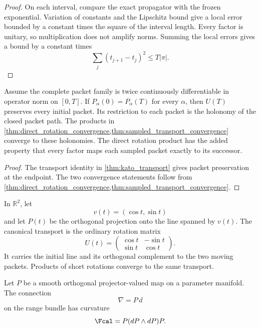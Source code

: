 \begin{proof}
On each interval, compare the exact propagator with the frozen exponential.  Variation of constants and the Lipschitz bound give a local error bounded by a constant times the square of the interval length.  Every factor is unitary, so multiplication does not amplify norms.  Summing the local errors gives a bound by a constant times
\[
\sum_j(t_{j+1}-t_j)^2
\le
T|\pi|.
\]
\end{proof}

\begin{corollary}\label{cor:continuous_holonomy}
Assume the complete packet family is twice continuously differentiable in operator norm on $[0,T]$. If $P_\alpha(0)=P_\alpha(T)$ for every $\alpha$, then $U(T)$ preserves every initial packet.  Its restriction to each packet is the holonomy of the closed packet path.  The products in \cref{thm:direct_rotation_convergence,thm:sampled_transport_convergence} converge to these holonomies.  The direct rotation product has the added property that every factor maps each sampled packet exactly to its successor.
\end{corollary}

\begin{proof}
The transport identity in \cref{thm:kato_transport} gives packet preservation at the endpoint.  The two convergence statements follow from \cref{thm:direct_rotation_convergence,thm:sampled_transport_convergence}.
\end{proof}

\begin{example}\label{ex:rotating_line}
In $\mathbb R^2$, let
\[
v(t)=(\cos t,\sin t)
\]
and let $P(t)$ be the orthogonal projection onto the line spanned by $v(t)$.  The canonical transport is the ordinary rotation matrix
\[
U(t)=
\begin{pmatrix}
\cos t&-\sin t\\
\sin t&\cos t
\end{pmatrix}.
\]
It carries the initial line and its orthogonal complement to the two moving packets.  Products of short rotations converge to the same transport.
\end{example}


\begin{standardfact}\label{fact:projected_curvature}
Let $P$ be a smooth orthogonal projector-valued map on a parameter manifold.  The connection
\[
\nabla=P\,d
\]
on the range bundle has curvature
\[
\Fcal=P(dP\wedge dP)P.
\]
\end{standardfact}

